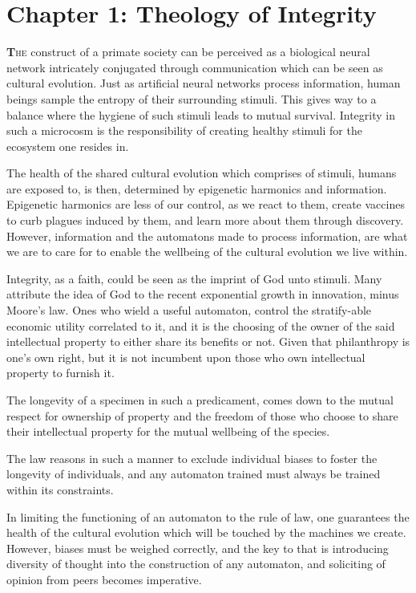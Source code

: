 \documentclass[ebook,12pt,oneside,openany]{memoir}
\begin{document}
\chapter*{Chapter 1: Theology of Integrity}


\indent \indent \lettrine[lines=2]{\fontsize{48}{56}\selectfont\textbf{T}}{he} construct of a primate society can be perceived as a biological neural network intricately conjugated through communication which can be seen as cultural evolution. Just as artificial neural networks process information, human beings sample the entropy of their surrounding stimuli. This gives way to a balance where the hygiene of such stimuli leads to mutual survival. Integrity in such a microcosm is the responsibility of creating healthy stimuli for the ecosystem one resides in.

\indent The health of the shared cultural evolution which comprises of stimuli, humans are exposed to, is then, determined by epigenetic harmonics and information. Epigenetic harmonics are less of our control, as we react to them, create vaccines to curb plagues induced by them, and learn more about them through discovery. However, information and the automatons made to process information, are what we are to care for to enable the wellbeing of the cultural evolution we live within.

\indent Integrity, as a faith, could be seen as the imprint of God unto stimuli. Many attribute the idea of God to the recent exponential growth in innovation, minus Moore’s law. Ones who wield a useful automaton, control the stratify-able economic utility correlated to it, and it is the choosing of the owner of the said intellectual property to either share its benefits or not. Given that philanthropy is one's own right, but it is not incumbent upon those who own intellectual property to furnish it.

\indent The longevity of a specimen in such a predicament, comes down to the mutual respect for ownership of property and the freedom of those who choose to share their intellectual property for the mutual wellbeing of the species.

\indent 	The law reasons in such a manner to exclude individual biases to foster the longevity of individuals, and any automaton trained must always be trained within its constraints.

\indent 	In limiting the functioning of an automaton to the rule of law, one guarantees the health of the cultural evolution which will be touched by the machines we create. However, biases must be weighed correctly, and the key to that is introducing diversity of thought into the construction of any automaton, and soliciting of opinion from peers becomes imperative.
\end{document}
